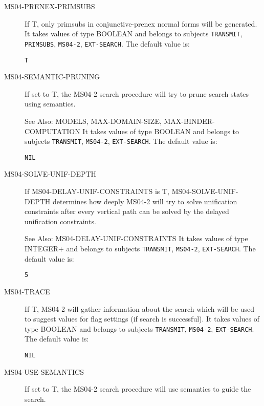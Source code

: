 \begin{description}
\item[MS04-PRENEX-PRIMSUBS]  
If T, only primsubs in conjunctive-prenex normal forms will be generated.
It takes values of type BOOLEAN and belongs to subjects \texttt{TRANSMIT}, \texttt{PRIMSUBS}, \texttt{MS04-2}, \texttt{EXT-SEARCH}.  The default value is: \begin{lstlisting}
T
\end{lstlisting}

\item[MS04-SEMANTIC-PRUNING]  
If set to T, the MS04-2 search procedure will try to prune search
states using semantics.

See Also: MODELS, MAX-DOMAIN-SIZE, MAX-BINDER-COMPUTATION
It takes values of type BOOLEAN and belongs to subjects \texttt{TRANSMIT}, \texttt{MS04-2}, \texttt{EXT-SEARCH}.  The default value is: \begin{lstlisting}
NIL
\end{lstlisting}

\item[MS04-SOLVE-UNIF-DEPTH]  
If MS04-DELAY-UNIF-CONSTRAINTS is T, MS04-SOLVE-UNIF-DEPTH determines
how deeply MS04-2 will try to solve unification constraints after
every vertical path can be solved by the delayed unification
constraints.

See Also: MS04-DELAY-UNIF-CONSTRAINTS
It takes values of type INTEGER+ and belongs to subjects \texttt{TRANSMIT}, \texttt{MS04-2}, \texttt{EXT-SEARCH}.  The default value is: \begin{lstlisting}
5
\end{lstlisting}

\item[MS04-TRACE]  
If T, MS04-2 will gather information about the search which will be
used to suggest values for flag settings (if search is successful).
It takes values of type BOOLEAN and belongs to subjects \texttt{TRANSMIT}, \texttt{MS04-2}, \texttt{EXT-SEARCH}.  The default value is: \begin{lstlisting}
NIL
\end{lstlisting}

\item[MS04-USE-SEMANTICS]  
If set to T, the MS04-2 search procedure will use semantics to
guide the search.


\end{description}

